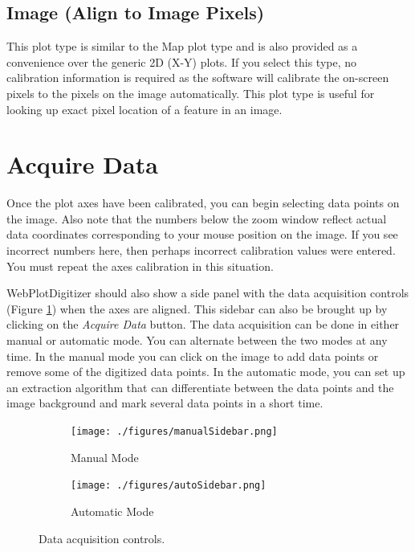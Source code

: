 \documentclass[letterpaper, 10pt]{article}
\begin{document}
\subsection{Image (Align to Image Pixels)}
This plot type is similar to the Map plot type and is also provided as a convenience over the generic 2D (X-Y) plots. If you select this type, no calibration information is required as the software will calibrate the on-screen pixels to the pixels on the image automatically. This plot type is useful for looking up exact pixel location of a feature in an image.

\section{Acquire Data}

Once the plot axes have been calibrated, you can begin selecting data points on the image. Also note that the numbers below the zoom window reflect actual data coordinates corresponding to your mouse position on the image. If you see incorrect numbers here, then perhaps incorrect calibration values were entered. You must repeat the axes calibration in this situation. 

WebPlotDigitizer should also show a side panel with the data acquisition controls (Figure \ref{fig:acquireData}) when the axes are aligned. This sidebar can also be brought up by clicking on the \emph{Acquire Data} button. The data acquisition can be done in either manual or automatic mode. You can alternate between the two modes at any time. In the manual mode you can click on the image to add data points or remove some of the digitized data points. In the automatic mode, you can set up an extraction algorithm that can differentiate between the data points and the image background and mark several data points in a short time.

\begin{figure}
\centering
{
\begin{subfigure}{0.3\textwidth}
\texttt{[image: ./figures/manualSidebar.png]}
\caption{Manual Mode}
\end{subfigure}
\begin{subfigure}{0.3\textwidth}
\texttt{[image: ./figures/autoSidebar.png]}
\caption{Automatic Mode}
\end{subfigure}
}
\caption{Data acquisition controls.}
\label{fig:acquireData}
\end{figure}
\end{document}
